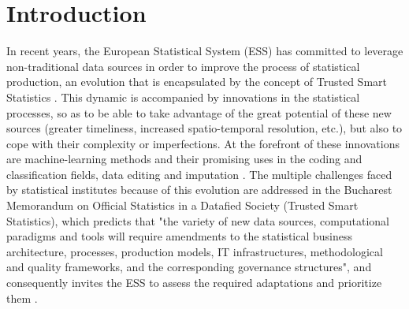 \documentclass[graybox]{svmult}
\begin{document}




\section{Introduction}
\label{sec:introduction}

In recent years, the European Statistical System (ESS) has committed to leverage non-traditional data sources in order to improve the process of statistical production, an evolution that is encapsulated by the concept of Trusted Smart Statistics \cite{ricciato2019trusted}. This dynamic is accompanied by innovations in the statistical processes, so as to be able to take advantage of the great potential of these new sources (greater timeliness, increased spatio-temporal resolution, etc.), but also to cope with their complexity or imperfections. At the forefront of these innovations are machine-learning methods and their promising uses in the coding and classification fields, data editing and imputation \cite{gjaltema2022high}. The multiple challenges faced by statistical institutes because of this evolution are addressed in the Bucharest Memorandum on Official Statistics in a Datafied Society (Trusted Smart Statistics), which predicts that "the variety of new data sources, computational paradigms and tools will require amendments to the statistical business architecture, processes, production models, IT infrastructures, methodological and quality frameworks, and the corresponding governance structures", and consequently invites the ESS to assess the required adaptations and prioritize them \cite{bucharest2018}.
\end{document}
